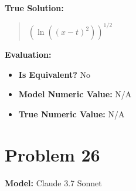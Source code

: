 \documentclass{article}
\begin{document}
\textbf{True Solution:}
\begin{quote}
$(\ln((x-t)^2))^{1/2}$
\end{quote}

\textbf{Evaluation:}
\begin{itemize}
\item \textbf{Is Equivalent?} No
\item \textbf{Model Numeric Value:} N/A
\item \textbf{True Numeric Value:} N/A
\end{itemize}
\vspace{1cm}
\section*{Problem 26}
\textbf{Model:} Claude 3.7 Sonnet
\end{document}
